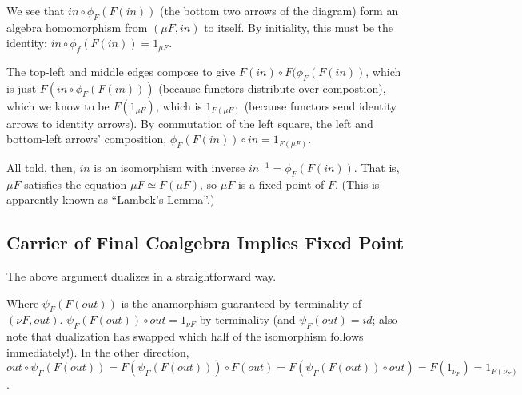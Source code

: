 \documentclass[letterpaper]{article}
\begin{document}
We see that $in \circ \phi_F(F(in))$ (the bottom two arrows of the diagram)
form an algebra homomorphism from $(\mu F, in)$ to itself.  By initiality,
this must be the identity: $in \circ \phi_f(F(in)) = 1_{\mu F}$.

The top-left and middle edges compose to give $F(in) \circ F(\phi_F(F(in))$,
which is just $F(in \circ \phi_F(F(in)))$ (because functors distribute over
compostion), which we know to be $F(1_{\mu F})$, which is $1_{F(\mu F)}$
(because functors send identity arrows to identity arrows).  By commutation
of the left square, the left and bottom-left arrows' composition,
$\phi_F(F(in)) \circ in = 1_{F(\mu F)}$.

All told, then, $in$ is an isomorphism with inverse $in^{-1} = \phi_F(F(in))$.
That is, $\mu F$ satisfies the equation $\mu F \simeq F(\mu F)$, so $\mu F$
is a fixed point of $F$.  (This is apparently known as ``Lambek's Lemma''.)

\subsection{Carrier of Final Coalgebra Implies Fixed Point}

The above argument dualizes in a straightforward way.
%
\begin{center}\end{center}
%
Where $\psi_F(F(out))$ is the anamorphism guaranteed by terminality of $(\nu
F, out)$.  $\psi_F(F(out)) \circ out = 1_{\nu F}$ by terminality (and
$\psi_F(out) = id$; also note that dualization has swapped which half of the
isomorphism follows immediately!).  In the other direction, $out \circ
\psi_F(F(out)) = F(\psi_F(F(out))) \circ F(out) = F(\psi_F(F(out)) \circ
out) = F(1_{\nu_F}) = 1_{F(\nu_F)}$.
\end{document}
